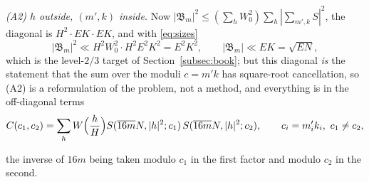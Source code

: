 \documentclass[11pt]{amsart}
\theoremstyle{remark}
\begin{document}
\emph{(A2) $h$ outside, $(m',k)$ inside.} Now $|\mathfrak B_m|^2\le(\sum_hW_0^2)\sum_h|\sum_{m',k}S|^2$, the diagonal is $H^2\cdot EK\cdot EK$, and with \eqref{eq:sizes}
\[
|\mathfrak B_m|^2\ll H^2W_0^2\cdot H^2E^2K^2=E^2K^2,\qquad|\mathfrak B_m|\ll EK=\sqrt{EN},
\]
which is the level-$2/3$ target of Section~\ref{subsec:book}; but this diagonal \emph{is} the statement that the sum over the moduli $c=m'k$ has square-root cancellation, so (A2) is a reformulation of the problem, not a method, and everything is in the off-diagonal terms
\begin{equation}\label{eq:corr}
C(c_1,c_2)=\sum_hW\Bigl(\frac hH\Bigr)S(\overline{16m}N,|h|^2;c_1)\,S(\overline{16m}N,|h|^2;c_2),\qquad c_i=m'_ik_i,\ c_1\ne c_2 ,
\end{equation}

the inverse of $16m$ being taken modulo $c_1$ in the first factor and modulo $c_2$ in the second.
\end{document}
